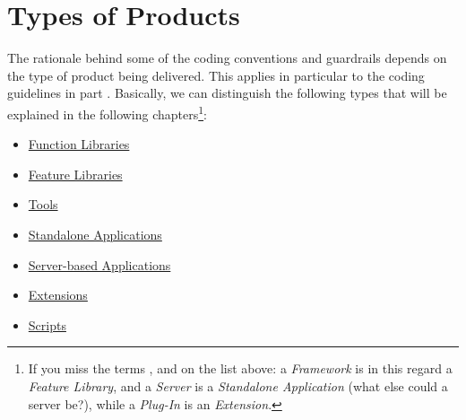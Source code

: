 \section{Types of Products}\label{sec:TypesOfProducts}
The rationale behind some of the coding conventions and guardrails depends on the type of product being delivered. This applies in particular to the coding guidelines in part . Basically, we can distinguish the following types that will be explained in the following chapters\footnote{If you miss the terms ,  and  on the list above: a \textit{Framework} is in this regard a \textit{Feature Library}, and a \textit{Server} is a \textit{Standalone Application} (what else could a server be?), while a \textit{Plug-In} is an \textit{Extension}.}:

\begin{itemize}[nosep]
	\item{\hyperref[sec:FunctionLibrary]{Function Libraries}}
	
	\item{\hyperref[sec:FeatureLibrary]{Feature Libraries}}

	\item{\hyperref[sec:Tool]{Tools}}
	
	\item{\hyperref[sec:StandaloneApplication]{Standalone Applications}}

	\item{\hyperref[sec:ServerbasedApplication]{Server-based Applications}}
	
	\item{\hyperref[sec:Extension]{Extensions}}

	\item{\hyperref[sec:ScriptInJava]{Scripts}}
\end{itemize}

